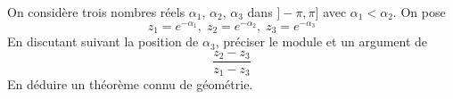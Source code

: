 On considère trois nombres réels $\alpha_1$, $\alpha_2$, $\alpha_3$ dans $]-\pi, \pi]$ avec $\alpha_1 <\alpha_2$. On pose 
\begin{displaymath}
z_1=e^{-\alpha_1},\;z_2=e^{-\alpha_2},\;z_3=e^{-\alpha_3} 
\end{displaymath}
En discutant suivant la position de $\alpha_3$, préciser le module et un argument de
\[\frac{z_2-z_3}{z_1-z_3}\] 
En déduire un théorème connu de géométrie.